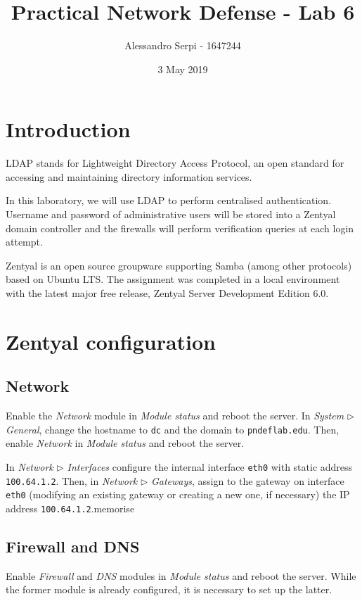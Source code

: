 \documentclass[draft]{homework}
\title{Practical Network Defense - Lab 6}
\author{Alessandro Serpi - 1647244}
\date{3 May 2019}
\begin{document}
    \maketitle
    \tableofcontents
    
    
    \pagebreak
    \section{Introduction}
    LDAP stands for Lightweight Directory Access Protocol, an open standard for accessing and maintaining directory information services.
    
    In this laboratory, we will use LDAP to perform centralised authentication.
    Username and password of administrative users will be stored into a Zentyal domain controller and the firewalls will perform verification queries at each login attempt.
    
    Zentyal is an open source groupware supporting Samba (among other protocols) based on Ubuntu LTS.
    The assignment was completed in a local environment with the  latest major free release, Zentyal Server Development Edition 6.0.
    
    
    \section{Zentyal configuration}
    \subsection{Network}
    Enable the \textit{Network} module in \textit{Module status} and reboot the server.
    In \textit{System} $\triangleright$ \textit{General}, change the hostname to \texttt{dc} and the domain to \texttt{pndeflab.edu}.
    Then, enable \textit{Network} in \textit{Module status} and reboot the server.
    
    In \textit{Network} $\triangleright$ \textit{Interfaces} configure the internal interface \texttt{eth0} with static address \texttt{100.64.1.2}. 
    Then, in \textit{Network} $\triangleright$ \textit{Gateways}, assign to the gateway on interface \texttt{eth0} (modifying an existing gateway or creating a new one, if necessary) the IP address \texttt{100.64.1.2}.memorise
        
    \subsection{Firewall and DNS}
    Enable \textit{Firewall} and \textit{DNS} modules in \textit{Module status} and reboot the server.
    While the former module is already configured, it is necessary to set up the latter.
    
\end{document}

